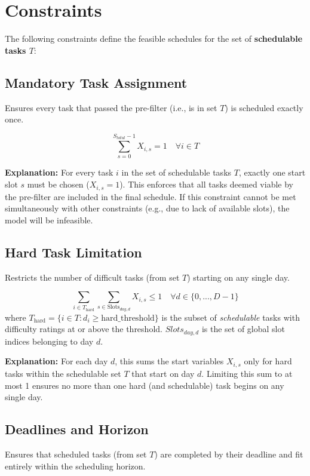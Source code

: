 \documentclass{article}
\begin{document}
\section{Constraints}

The following constraints define the feasible schedules for the set of \textbf{schedulable tasks $T$}:

\subsection{Mandatory Task Assignment}
Ensures every task that passed the pre-filter (i.e., is in set $T$) is scheduled exactly once.

\begin{equation}
\sum_{s=0}^{S_{total}-1} X_{i,s} = 1 \quad \forall i \in T \label{eq:task_must_start}
\end{equation}

\textbf{Explanation:} For every task $i$ in the set of schedulable tasks $T$, exactly one start slot $s$ must be chosen ($X_{i,s}=1$). This enforces that all tasks deemed viable by the pre-filter are included in the final schedule. If this constraint cannot be met simultaneously with other constraints (e.g., due to lack of available slots), the model will be infeasible.

\subsection{Hard Task Limitation}
Restricts the number of difficult tasks (from set $T$) starting on any single day.

\[
\sum_{i \in T_{\text{hard}}} \sum_{s \in \text{Slots}_{day,d}} X_{i,s} \leq 1 \quad \forall d \in \{0, ..., D-1\}
\]
where $T_{\text{hard}} = \{i \in T : d_i \geq \text{hard\_threshold}\}$ is the subset of \textit{schedulable} tasks with difficulty ratings at or above the threshold. $Slots_{day,d}$ is the set of global slot indices belonging to day $d$.

\textbf{Explanation:} For each day $d$, this sums the start variables $X_{i,s}$ only for hard tasks within the schedulable set $T$ that start on day $d$. Limiting this sum to at most 1 ensures no more than one hard (and schedulable) task begins on any single day.

\subsection{Deadlines and Horizon}
Ensures that scheduled tasks (from set $T$) are completed by their deadline and fit entirely within the scheduling horizon.
\end{document}
